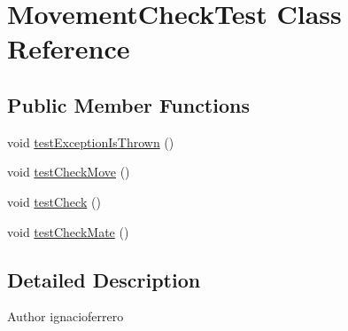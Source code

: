 \hypertarget{class_movement_check_test}{\section{Movement\-Check\-Test Class Reference}
\label{class_movement_check_test}
}
\subsection*{Public Member Functions}
\begin{DoxyCompactItemize}
\item 
void \hyperlink{class_movement_check_test_ad2909b021508f999bffedc9dc744a737}{test\-Exception\-Is\-Thrown} ()
\item 
void \hyperlink{class_movement_check_test_af9b5c9b924d8d81b1e298aee638f8f77}{test\-Check\-Move} ()
\item 
void \hyperlink{class_movement_check_test_a701b7fb280075841f2deac18bc41eb86}{test\-Check} ()
\item 
void \hyperlink{class_movement_check_test_a06f6f6fa710f8177f2f8d3eb047ebe7c}{test\-Check\-Mate} ()
\end{DoxyCompactItemize}


\subsection{Detailed Description}
\begin{DoxyAuthor}{Author}
ignacioferrero 
\end{DoxyAuthor}


